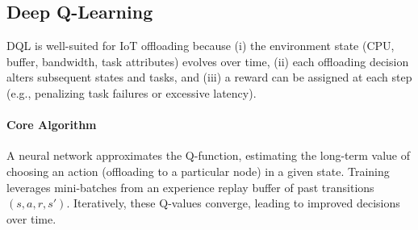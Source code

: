 \documentclass[preprint,3p,authoryear]{elsarticle}
\begin{document}
\subsection{Deep Q-Learning}\label{subsec:DQL}

DQL is well-suited for IoT offloading because (i) the environment state (CPU, buffer, bandwidth, task attributes) evolves over time, (ii) each offloading decision alters subsequent states and tasks, and (iii) a reward can be assigned at each step (e.g., penalizing task failures or excessive latency).

\paragraph{Core Algorithm}
A neural network approximates the Q-function, estimating the long-term value of choosing an action (offloading to a particular node) in a given state. Training leverages mini-batches from an experience replay buffer of past transitions \((s,a,r,s')\). Iteratively, these Q-values converge, leading to improved decisions over time.
\end{document}
